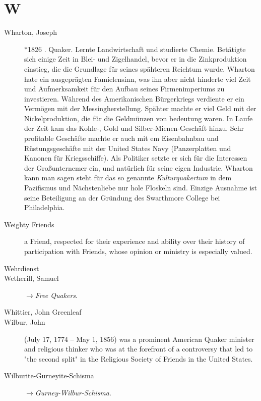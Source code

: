 \section*{W}

\articlesize

\begin{description}

 \item[Wharton, Joseph] $\ast$1826 . Quaker. Lernte Landwirtschaft
 und studierte Chemie. Betätigte sich einige Zeit in Blei- und Zigelhandel,
 bevor er in die Zinkproduktion einstieg, die die Grundlage für seines
 spähteren Reichtum wurde. Wharton hate ein ausgeprägten Famielensinn, was ihn
 aber nicht hinderte viel Zeit und Aufmerksamkeit für den Aufbau seines
 Firmenimperiums zu investieren. Während des Amerikanischen Bürgerkriegs
 verdiente er ein Vermögen mit der Messingherstellung. Spähter machte er viel
 Geld mit der Nickelproduktion, die für die Geldmünzen von bedeutung waren.
 In Laufe der Zeit kam das Kohle-, Gold und Silber-Mienen-Geschäft hinzu.
 Sehr profitable Geschäfte machte er auch mit em Eisenbahnbau und
 Rüstungsgeschäfte mit der United States Navy (Panzerplatten und Kanonen
 für Kriegsschiffe). Als Politiker setzte er sich für die Interessen der
 Großunternemer ein, und natürlich für seine eigen Industrie. Wharton kann
 man sagen steht für das so genannte \textit{Kulturquakertum} in dem
 Pazifismus und Nächstenliebe nur hole Floskeln sind. Einzige Ausnahme ist
 seine Beteiligung an der Gründung des Swarthmore College bei Philadelphia.

 \item[Weighty Friends]
    a Friend, respected for their experience and ability over their history of participation with Friends, whose opinion or ministry is especially valued.

 
 \item[Wehrdienst]

 \item[Wetherill, Samuel] $\to$\textit{Free Quakers}.

 \item[Whittier, John Greenleaf]

 \item[Wilbur, John] (July 17, 1774 – May 1, 1856) was a prominent American Quaker minister and religious thinker who was at the forefront of a controversy that led to "the second split" in the Religious Society of Friends in the United States.

 \item[Wilburite-Gurneyite-Schisma] $\to$\textit{Gurney-Wilbur-Schisma}.


\end{description}
